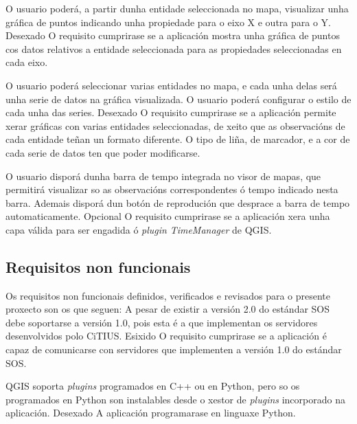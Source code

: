 		  	{O usuario poderá, a partir dunha entidade seleccionada no mapa, visualizar unha gráfica de puntos indicando unha propiedade para o eixo X e outra para o Y.}%
			{Desexado}%
			{O requisito cumprirase se a aplicación mostra unha gráfica de puntos cos datos relativos a entidade seleccionada para as propiedades seleccionadas en cada eixo.}%
			
		  	{O usuario poderá seleccionar varias entidades no mapa, e cada unha delas será unha serie de datos na gráfica visualizada. O usuario poderá configurar o estilo de cada unha das series.}%
			{Desexado}%
			{O requisito cumprirase se a aplicación permite xerar gráficas con varias entidades seleccionadas, de xeito que as observacións de cada entidade teñan un formato diferente. O tipo de liña, de marcador, e a cor de cada serie de datos ten que poder modificarse.}%
			
		  	{O usuario disporá dunha barra de tempo integrada no visor de mapas, que permitirá visualizar so as observacións correspondentes ó tempo indicado nesta barra. Ademais disporá dun botón de reprodución que desprace a barra de tempo automaticamente.}%
			{Opcional}%
			{O requisito cumprirase se a aplicación xera unha capa válida para ser engadida ó \emph{plugin} \emph{TimeManager} de QGIS.}%

\subsection{Requisitos non funcionais}
Os requisitos non funcionais definidos, verificados e revisados para o presente proxecto son os que seguen:
\newpage	
{}
		  	{A pesar de existir a versión 2.0 do estándar SOS debe soportarse a versión 1.0, pois esta é a que implementan os servidores desenvolvidos polo CiTIUS.}%
			{Esixido}%
			{O requisito cumprirase se a aplicación é capaz de comunicarse con servidores que implementen a versión 1.0 do estándar SOS.}%
			
		  	{QGIS soporta \emph{plugins} programados en C++ ou en Python, pero so os programados en Python son instalables desde o xestor de \emph{plugins} incorporado na aplicación.}%
			{Desexado}%
			{A aplicación programarase en linguaxe Python.}%
			
